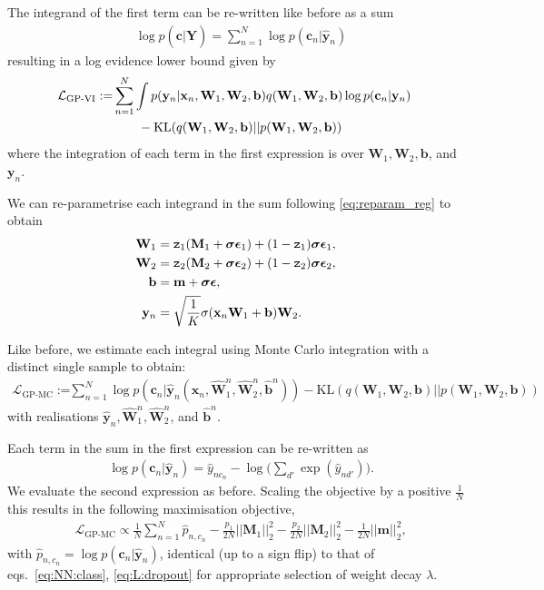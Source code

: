 \documentclass{article} %
\newcommand{\cL}{\mathcal{L}}
\newcommand{\td}{\text{d}}
\newcommand{\x}{\mathbf{x}}
\newcommand{\Bb}{\mathbf{b}}
\newcommand{\sBb}{\mathtt{z}}
\newcommand{\y}{\mathbf{y}}
\newcommand{\W}{\mathbf{W}}
\newcommand{\m}{\mathbf{m}}
\newcommand{\Y}{\mathbf{Y}}
\newcommand{\M}{\mathbf{M}}
\newcommand{\bepsilon}{\text{\boldmath$\epsilon$}}
\newcommand{\bsigma}{\text{\boldmath$\sigma$}}
\newcommand{\KL}{\text{KL}}
\newcommand{\bc}{\mathbf{c}}
\newcommand{\weightdecay}{\lambda}
\theoremstyle{definition}
\begin{document}
The integrand of the first term can be re-written like before as a sum
\begin{align*}
&\log p(\bc | \widehat{\Y}) =
\sum\limits_{n=1}^N \log p(\bc_n | \widehat{\y}_n)
\end{align*}
resulting in a log evidence lower bound given by
\begin{align*}
\hspace{-1mm}
\cL_{\text{GP-VI}} := &\sum_{n=1}^N \int p(\y_n|\x_n, \W_1, \W_2, \Bb) q(\W_1, \W_2, \Bb) \log p(\bc_n | \y_n) %
\notag\\
&\qquad - \KL(q(\W_1, \W_2, \Bb) || p(\W_1, \W_2, \Bb))
\end{align*}
where the integration of each term in the first expression is over $\W_1, \W_2, \Bb$, and $\y_n$. 

We can re-parametrise each integrand in the sum following \eqref{eq:reparam_reg} to obtain 
\begin{align} \label{eq:reparam_class}
\W_1 &= \sBb_1 (\M_1 + \bsigma \bepsilon_1) + (1-\sBb_1) \bsigma \bepsilon_1 , \notag\\
\W_2 &= \sBb_2 (\M_2 + \bsigma \bepsilon_2) + (1-\sBb_2) \bsigma \bepsilon_2 , \notag\\
\Bb &= \m + \bsigma \bepsilon, \notag\\
\y_n &= \sqrt{\frac{1}{K}} \sigma(\x_n \W_1 + \Bb) \W_2.
\end{align}

Like before, we estimate each integral using Monte Carlo integration with a distinct single sample to obtain:
\begin{align*}
\cL_{\text{GP-MC}} := &\sum_{n=1}^N \log p(\bc_n | \widehat{\y}_n(\x_n, \widehat{\W}_1^n, \widehat{\W}_2^n, \widehat{\Bb}^n)) - \KL(q(\W_1, \W_2, \Bb) || p(\W_1, \W_2, \Bb))
\end{align*}
with realisations $\widehat{\y}_n, \widehat{\W}_1^n, \widehat{\W}_2^n$, and $\widehat{\Bb}^n$.

Each term in the sum in the first expression can be re-written as
\begin{align*}
&\log p(\bc_n | \widehat{\y}_n) =
\widehat{y}_{n c_n}
- \log \bigg( \sum_{d'} \exp(\widehat{y}_{nd'}) \bigg).
\end{align*}
We evaluate the second expression as before. Scaling the objective by a positive $\frac{1}{N}$ this results in the following maximisation objective,
\begin{align*}
&\cL_{\text{GP-MC}} \propto \frac{1}{N} \sum\limits_{n=1}^N 
\widehat{p}_{n, c_n}
- \frac{p_1}{2 N} ||\M_1||^2_2 - \frac{p_2}{2 N} ||\M_2||^2_2 - \frac{1}{2 N}||\m||^2_2,
\end{align*}
with $\widehat{p}_{n, c_n} = \log p(\bc_n | \widehat{\y}_n)$, identical (up to a sign flip) to that of eqs.\ \eqref{eq:NN:class}, \eqref{eq:L:dropout} for appropriate selection of weight decay $\weightdecay$.
\end{document}
